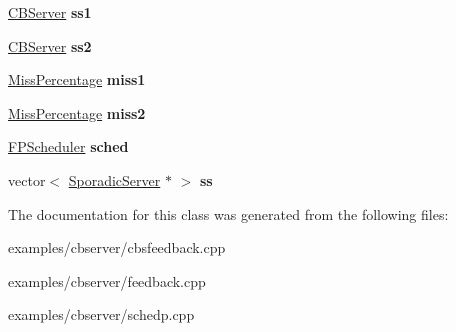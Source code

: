 \begin{DoxyCompactItemize}
\item 
\hyperlink{classRTSim_1_1CBServer}{C\+B\+Server} {\bfseries ss1}\hypertarget{classSystem_a36424700aee307779b26037c60cfcb9c}{}\label{classSystem_a36424700aee307779b26037c60cfcb9c}

\item 
\hyperlink{classRTSim_1_1CBServer}{C\+B\+Server} {\bfseries ss2}\hypertarget{classSystem_a9653a769588a529ea19648af55c66eb6}{}\label{classSystem_a9653a769588a529ea19648af55c66eb6}

\item 
\hyperlink{classRTSim_1_1MissPercentage}{Miss\+Percentage} {\bfseries miss1}\hypertarget{classSystem_a4f3665419fedf97c3edec9ab1d93c8e3}{}\label{classSystem_a4f3665419fedf97c3edec9ab1d93c8e3}

\item 
\hyperlink{classRTSim_1_1MissPercentage}{Miss\+Percentage} {\bfseries miss2}\hypertarget{classSystem_a0ec0077e4794b9f380d5a334a0bfbaf4}{}\label{classSystem_a0ec0077e4794b9f380d5a334a0bfbaf4}

\item 
\hyperlink{classRTSim_1_1FPScheduler}{F\+P\+Scheduler} {\bfseries sched}\hypertarget{classSystem_a802f29f773e289be59bd92517fd1a314}{}\label{classSystem_a802f29f773e289be59bd92517fd1a314}

\item 
vector$<$ \hyperlink{classRTSim_1_1SporadicServer}{Sporadic\+Server} $\ast$ $>$ {\bfseries ss}\hypertarget{classSystem_a1bc1f5f17853a927cd6eb79a256e212a}{}\label{classSystem_a1bc1f5f17853a927cd6eb79a256e212a}

\end{DoxyCompactItemize}


The documentation for this class was generated from the following files\+:\begin{DoxyCompactItemize}
\item 
examples/cbserver/cbsfeedback.\+cpp\item 
examples/cbserver/feedback.\+cpp\item 
examples/cbserver/schedp.\+cpp\end{DoxyCompactItemize}
